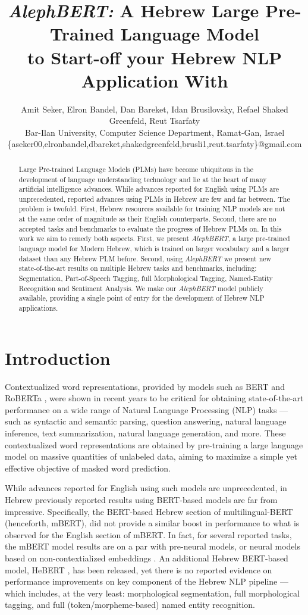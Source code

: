 \documentclass[11pt,a4paper]{article}
\title{{\it AlephBERT:} A  Hebrew Large Pre-Trained Language Model \\to Start-off your Hebrew NLP Application With}
\author{Amit Seker, Elron Bandel, Dan Bareket,  Idan Brusilovsky, Refael Shaked Greenfeld, Reut Tsarfaty\\
Bar-Ilan University, Computer Science Department, Ramat-Gan, Israel\\\{aseker00,elronbandel,dbareket,shakedgreenfeld,brusli1,reut.tsarfaty\}@gmail.com}
\date{}
\begin{document}
\maketitle
\begin{abstract}
Large Pre-trained Language Models (PLMs) have become ubiquitous in the development of language understanding technology and 
lie at the heart of many artificial intelligence advances.
While advances reported for English using PLMs are unprecedented, reported advances using PLMs  in Hebrew are few and far between. The problem is twofold. First, Hebrew resources available for training NLP models are not at the same order of magnitude as their English counterparts.
Second, there are no accepted tasks and benchmarks to evaluate the progress of Hebrew PLMs on. In this work we aim to remedy both aspects. First, we present {\em AlephBERT}, a  large pre-trained language model 
for Modern Hebrew, which is trained on larger vocabulary and a larger dataset than any Hebrew PLM before. Second, using {\em AlephBERT} we present new state-of-the-art results on multiple Hebrew tasks and benchmarks, including: Segmentation, Part-of-Speech Tagging, full Morphological Tagging, Named-Entity Recognition and Sentiment Analysis. 
We make our {\em AlephBERT} model publicly available, providing a single  point of entry for the development of Hebrew NLP applications.
\end{abstract}
\section{Introduction}
Contextualized word representations, provided by models such as BERT \cite{bert} and  RoBERTa \cite{roberta}, were shown in recent years to be critical for obtaining  state-of-the-art performance on a wide range of Natural Language Processing (NLP) tasks --- such as syntactic and semantic parsing, question answering, natural language inference, text summarization, natural language generation, and  more. These  contextualized word representations are obtained by  pre-training a large language model on massive quantities of unlabeled data,  aiming to maximize  a  simple yet effective objective of {masked word prediction}. 


While advances reported for English using such models are unprecedented, in Hebrew previously reported results using BERT-based models are far from impressive. Specifically, the BERT-based Hebrew section of multilingual-BERT  \cite{bert} (henceforth, mBERT), did not provide a similar boost in performance to what is observed for the English section of mBERT. In fact, for several reported tasks, the mBERT model results are on a par with pre-neural models, or neural models based on non-contextialized embeddings \cite{tsarfaty2020,klein2020}. An additional Hebrew BERT-based model, HeBERT \cite{hebert}, has been released,  yet there is no reported evidence on  performance improvements on key component of the Hebrew NLP pipeline --- which includes, at the very least: morphological segmentation,  full morphological tagging, and full (token/morpheme-based) named entity recognition. 
\end{document}
